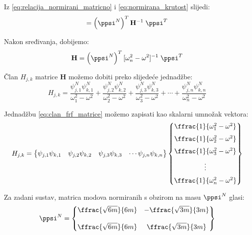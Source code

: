 Iz \eqref{eq:relacija_normirani_matricno} i \eqref{eq:normirana_krutost} slijedi:
\begin{equation}
    [\omega_n^2 - \omega^2] = \left(\ppsi^N\right)^T\mathbf{H}^{-1}\;\ppsi^T
\end{equation}

Nakon sređivanja, dobijemo:
\begin{equation}
    \mathbf{H}=\left(\ppsi^N\right)^T[\omega_n^2 - \omega^2]^{-1}\;\ppsi^T
\end{equation}

Član $H_{j,k}$ matrice $\mathbf{H}$ možemo dobiti preko slijedeće jednadžbe:
\begin{equation}\label{eq:clan_frf_matrice}
    H_{j,k}=\frac{\psi^N_{j,1}\psi^N_{k,1}}{\omega_1^2-\omega^2}
            +
            \frac{\psi^N_{j,2}\psi^N_{k,2}}{\omega_2^2-\omega^2}
            +
            \frac{\psi^N_{j,3}\psi^N_{k,3}}{\omega_3^2-\omega^2}
            +
            \cdots
            +
            \frac{\psi^N_{j,n}\psi^N_{k,n}}{\omega_n^2-\omega^2}
\end{equation}

Jednadžbu \eqref{eq:clan_frf_matrice} možemo zapisati kao skalarni umnožak vektora:
\begin{equation}\label{eq:clan_frf_matrica_vektorski}
    H_{j,k}
    =
    \begin{Bmatrix}
        \psi_{j,1}\psi_{k,1} &
        \psi_{j,2}\psi_{k,2} &
        \psi_{j,3}\psi_{k,3} &
        \cdots
        \psi_{j,n}\psi_{k,n}
    \end{Bmatrix}
    \begin{Bmatrix}
        \ffrac{1}{\omega_1^2-\omega^2}\\[6pt]
        \ffrac{1}{\omega_2^2-\omega^2}\\[6pt]
        \ffrac{1}{\omega_3^2-\omega^2}\\[6pt]
        \vdots\\[6pt]
        \ffrac{1}{\omega_n^2-\omega^2}
    \end{Bmatrix}
\end{equation}

Za zadani sustav, matrica modova normiranih s obzirom na masu $\ppsi^N$ glasi:
\[
    \ppsi^N
    =
    \begin{Bmatrix}
        \ffrac{\sqrt{6m}}{6m} & -\ffrac{\sqrt{3m}}{3m}\\[12pt]
        \ffrac{\sqrt{6m}}{6m} & \ffrac{\sqrt{3m}}{3m}
    \end{Bmatrix}
\]


